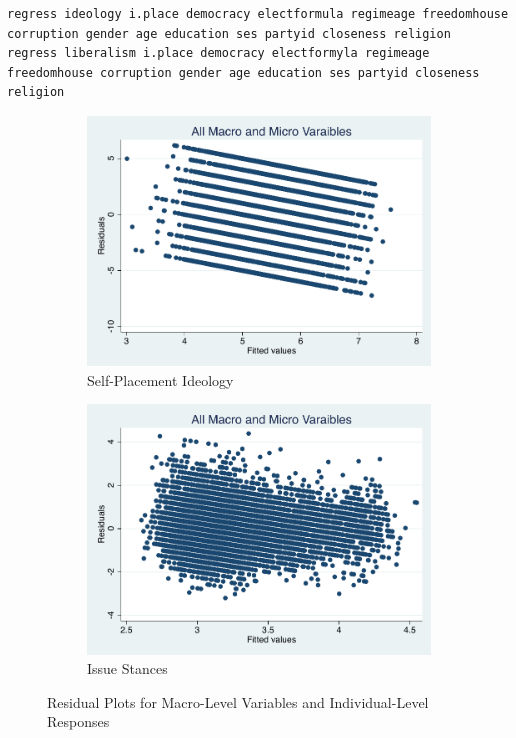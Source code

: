 \documentclass[12pt, titlepage]{article}
\begin{document}
\begin{verbatim}
regress ideology i.place democracy electformula regimeage freedomhouse corruption gender age education ses partyid closeness religion
regress liberalism i.place democracy electformyla regimeage freedomhouse corruption gender age education ses partyid closeness religion
\end{verbatim}

\begin{figure}[H]
	\centering
	\begin{subfigure}[b]{0.475\textwidth}   
		\centering 
		\includegraphics[width=\textwidth]{Residuals/Macroresid}
		\caption{Self-Placement Ideology}
	\end{subfigure}
	\hfill
	\begin{subfigure}[b]{0.475\textwidth}
		\centering 
		\includegraphics[width=\textwidth]{Residuals/Macroresidlib}
		\caption{Issue Stances}
	\end{subfigure}
	\caption{Residual Plots for Macro-Level Variables and Individual-Level Responses}
	\label{AllMacroRVF}
\end{figure}
\end{document}

